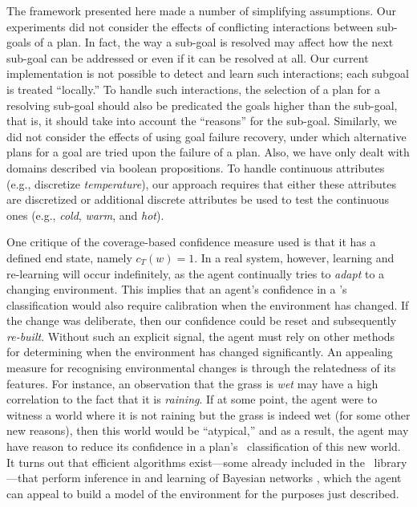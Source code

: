 The framework presented here made a number of simplifying assumptions.
Our experiments did not consider the effects of conflicting interactions between
sub-goals of a plan. In fact, the way a sub-goal is resolved may affect how the
next sub-goal can be addressed or even if it can be resolved at all.
Our current implementation is not possible to detect and learn such interactions;
each subgoal is treated ``locally.'' To handle such interactions, the selection
of a plan for a resolving sub-goal should also be predicated the goals higher
than the sub-goal, that is, it should take into account the ``reasons'' for the
sub-goal.
Similarly, we did not consider the effects of using goal failure recovery, under
which alternative plans for a goal are tried upon the failure of a plan.
Also, we have only dealt with domains described via boolean propositions. To
handle continuous attributes (e.g., discretize \emph{temperature}), our approach
requires that either these attributes are discretized or additional discrete
attributes be used to test the continuous ones (e.g., \emph{cold}, \emph{warm},
and \emph{hot}).


One critique of the coverage-based confidence measure used is that it has a
defined end state, namely $c_T(w)=1$. In a real system, however, learning and
re-learning will occur indefinitely, as the agent continually tries to
\emph{adapt} to a changing environment. This implies that an agent's confidence
in a \dt's classification would also require calibration when the environment has
changed. If the change was deliberate, then our confidence could be reset and
subsequently \textit{re-built}. Without such an explicit signal, the agent must
rely on other methods for determining when the environment has changed
significantly.
An appealing measure for recognising environmental changes is through the
relatedness of its features. For instance, an observation that the grass is
\textit{wet} may have a high correlation to the fact that it is \textit{raining}.
If at some point, the agent were to witness a world where it is not raining but
the grass is indeed wet (for some other new reasons), then this world would be
``atypical,''  and as a result, the agent may have reason to reduce its
confidence in a plan's \dt\ classification of this new world.
It turns out that efficient algorithms exist---some already included in the
\weka\ library---that perform inference in and learning of Bayesian networks
\cite{Mitchell97:ML}, which the agent can appeal to build a model of the
environment for the purposes just described.



